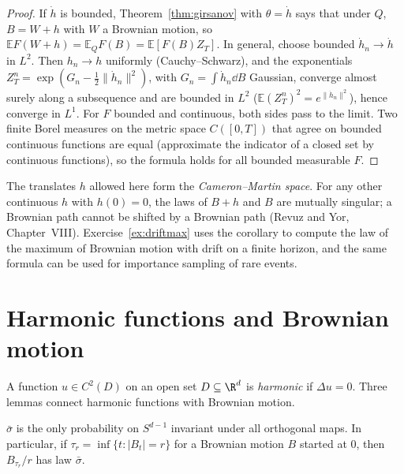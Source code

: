 \begin{proof}
If $\dot h$ is bounded, Theorem~\ref{thm:girsanov} with $\theta=\dot h$ says that under $Q$, $B=W+h$ with $W$ a Brownian motion, so $\mathbb EF(W+h)=\mathbb E_QF(B)=\mathbb E[F(B)Z_T]$. In general, choose bounded $\dot h_n\to\dot h$ in $L^2$.
Then $h_n\to h$ uniformly (Cauchy--Schwarz), and the exponentials $Z^n_T=\exp(G_n-\frac12\|\dot h_n\|^2)$, with $G_n=\int\dot h_n\dd B$ Gaussian, converge almost surely along a subsequence and are bounded in $L^2$
($\mathbb E(Z^n_T)^2=e^{\|\dot h_n\|^2}$), hence converge in $L^1$. For $F$ bounded and continuous, both sides pass to the limit. Two finite Borel measures on the metric space $C([0,T])$ that agree on bounded continuous functions are
equal (approximate the indicator of a closed set by continuous functions), so the formula holds for all bounded measurable $F$.
\end{proof}

The translates $h$ allowed here form the \emph{Cameron--Martin space}. For any other continuous $h$ with $h(0)=0$, the laws of $B+h$ and $B$ are mutually singular; a Brownian path cannot be shifted by a
Brownian path (Revuz and Yor, Chapter~VIII). Exercise~\ref{ex:driftmax} uses the corollary to compute the law of the maximum of Brownian motion with drift on a finite horizon, and the same formula can be used for
importance sampling of rare events.

\section{Harmonic functions and Brownian motion}

A function $u\in C^2(D)$ on an open set $D\subseteq\R^d$ is \emph{harmonic} if $\Delta u=0$. Three lemmas connect harmonic functions with Brownian motion.

\begin{lemma}\label{lem:uniformsphere}
$\bar\sigma$ is the only probability on $S^{d-1}$ invariant under all orthogonal maps. In particular, if $\tau_r=\inf\{t:|B_t|=r\}$ for a Brownian motion $B$ started at $0$, then $B_{\tau_r}/r$ has law $\bar\sigma$.
\end{lemma}

